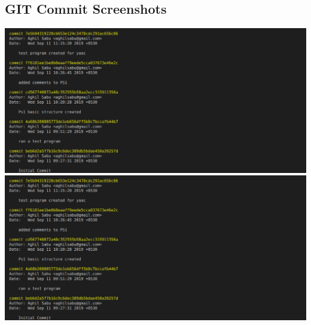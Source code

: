 \documentclass{article}
\begin{document}
    \subsection{GIT Commit Screenshots}
    \includegraphics[width=1.2\textwidth]{./images/gt_001.png}
    \includegraphics[width=1.2\textwidth]{./images/gt_001.png}
\end{document}
